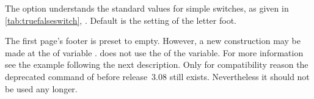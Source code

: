 The option understands the standard values for simple switches, as given in
\autoref{tab:truefalseswitch}, . Default is
the setting of the letter foot.
%

\begin{Declaration}
\end{Declaration}%
%
The first page's footer is preset to
empty. However, a new construction may be
made at the  of variable . \KOMAScript{}
does not use the  of the variable. For more information see
the example following the next description. Only for compatibility reason the
deprecated command  of
 before release~3.08 still exists. Nevertheless it should not
be used any longer.


